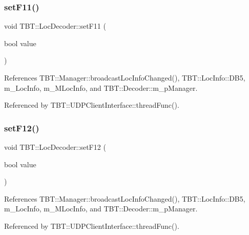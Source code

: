 \subsubsection{\texorpdfstring{set\+F11()}{setF11()}}
{\footnotesize\ttfamily void T\+B\+T\+::\+Loc\+Decoder\+::set\+F11 (\begin{DoxyParamCaption}\item[{bool}]{value }\end{DoxyParamCaption})\hspace{0.3cm}{\ttfamily [inline]}}



References T\+B\+T\+::\+Manager\+::broadcast\+Loc\+Info\+Changed(), T\+B\+T\+::\+Loc\+Info\+::\+D\+B5, m\+\_\+\+Loc\+Info, m\+\_\+\+M\+Loc\+Info, and T\+B\+T\+::\+Decoder\+::m\+\_\+p\+Manager.



Referenced by T\+B\+T\+::\+U\+D\+P\+Client\+Interface\+::thread\+Func().

\mbox{\label{classTBT_1_1LocDecoder_a8b7c59df79fb92011db6e5e5999ffd28_a8b7c59df79fb92011db6e5e5999ffd28}} 
\subsubsection{\texorpdfstring{set\+F12()}{setF12()}}
{\footnotesize\ttfamily void T\+B\+T\+::\+Loc\+Decoder\+::set\+F12 (\begin{DoxyParamCaption}\item[{bool}]{value }\end{DoxyParamCaption})\hspace{0.3cm}{\ttfamily [inline]}}



References T\+B\+T\+::\+Manager\+::broadcast\+Loc\+Info\+Changed(), T\+B\+T\+::\+Loc\+Info\+::\+D\+B5, m\+\_\+\+Loc\+Info, m\+\_\+\+M\+Loc\+Info, and T\+B\+T\+::\+Decoder\+::m\+\_\+p\+Manager.



Referenced by T\+B\+T\+::\+U\+D\+P\+Client\+Interface\+::thread\+Func().

\mbox{\label{classTBT_1_1LocDecoder_a90966aa043e13a5f2a8c4f4019c662c9_a90966aa043e13a5f2a8c4f4019c662c9}} 
